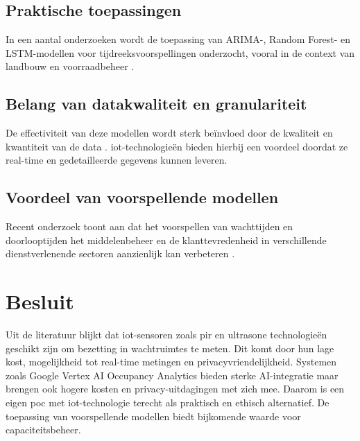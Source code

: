 \subsection{Praktische toepassingen}
In een aantal onderzoeken wordt de toepassing van ARIMA-, Random Forest- en LSTM-modellen voor tijdreeksvoorspellingen onderzocht, vooral in de context van landbouw en voorraadbeheer \autocite{Nagendra2023}. 

\subsection{Belang van datakwaliteit en granulariteit}
De effectiviteit van deze modellen wordt sterk beïnvloed door de kwaliteit en kwantiteit van de data \autocite{Mani2021}. \gls{iot}-technologieën bieden hierbij een voordeel doordat ze real-time en gedetailleerde gegevens kunnen leveren.

\subsection{Voordeel van voorspellende modellen}
Recent onderzoek toont aan dat het voorspellen van wachttijden en doorlooptijden het middelenbeheer en de klanttevredenheid in verschillende dienstverlenende sectoren aanzienlijk kan verbeteren \autocite{Benevento2021}.

\section{Besluit}
Uit de literatuur blijkt dat \gls{iot}-sensoren zoals \gls{pir} en ultrasone technologieën geschikt zijn om bezetting in wachtruimtes te meten. Dit komt door hun lage kost, mogelijkheid tot real-time metingen en privacyvriendelijkheid. Systemen zoals Google Vertex AI Occupancy Analytics bieden sterke AI-integratie maar brengen ook hogere kosten en privacy-uitdagingen met zich mee. Daarom is een eigen \gls{poc} met \gls{iot}-technologie terecht als praktisch en ethisch alternatief. De toepassing van voorspellende modellen biedt bijkomende waarde voor capaciteitsbeheer. %





